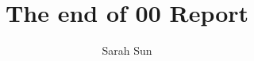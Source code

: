 \documentclass{amsart}
\begin{document}
	
\title[Group 00]{The end of 00 Report}%

\author{Sarah Sun}
\address[A.~1]{School of business and law,\\ 
Deakin University,Burwood, VIC}%


%
\date{\gitAuthorDate}%




\maketitle
\tableofcontents

\newpage


\end{document}
